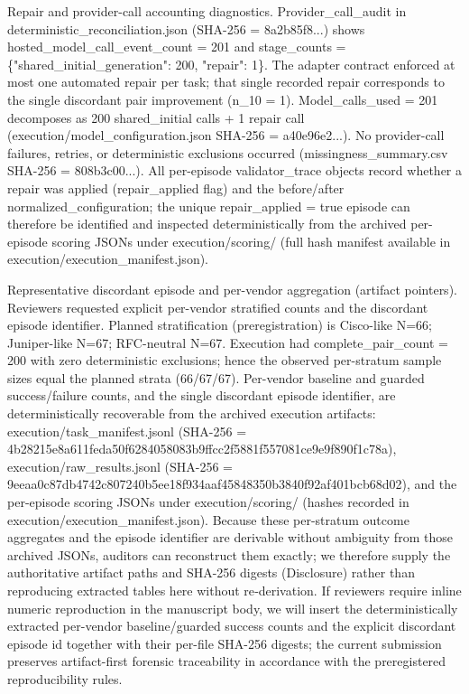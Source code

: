 \documentclass[conference]{IEEEtran}
\begin{document}
Repair and provider-call accounting diagnostics. Provider\_call\_audit in deterministic\_reconciliation.json (SHA-256 = 8a2b85f8...) shows hosted\_model\_call\_event\_count = 201 and stage\_counts = \{"shared\_initial\_generation": 200, "repair": 1\}. The adapter contract enforced at most one automated repair per task; that single recorded repair corresponds to the single discordant pair improvement (n\_10 = 1). Model\_calls\_used = 201 decomposes as 200 shared\_initial calls + 1 repair call (execution/model\_configuration.json SHA-256 = a40e96e2...). No provider-call failures, retries, or deterministic exclusions occurred (missingness\_summary.csv SHA-256 = 808b3c00...). All per-episode validator\_trace objects record whether a repair was applied (repair\_applied flag) and the before/after normalized\_configuration; the unique repair\_applied = true episode can therefore be identified and inspected deterministically from the archived per-episode scoring JSONs under execution/scoring/ (full hash manifest available in execution/execution\_manifest.json).

Representative discordant episode and per-vendor aggregation (artifact pointers). Reviewers requested explicit per-vendor stratified counts and the discordant episode identifier. Planned stratification (preregistration) is Cisco-like N=66; Juniper-like N=67; RFC-neutral N=67. Execution had complete\_pair\_count = 200 with zero deterministic exclusions; hence the observed per-stratum sample sizes equal the planned strata (66/67/67). Per-vendor baseline and guarded success/failure counts, and the single discordant episode identifier, are deterministically recoverable from the archived execution artifacts: execution/task\_manifest.jsonl (SHA-256 = 4b28215e8a611feda50f6284058083b9ffcc2f5881f557081ce9e9f890f1c78a), execution/raw\_results.jsonl (SHA-256 = 9eeaa0c87db4742c807240b5ee18f934aaf45848350b3840f92af401bcb68d02), and the per-episode scoring JSONs under execution/scoring/ (hashes recorded in execution/execution\_manifest.json). Because these per-stratum outcome aggregates and the episode identifier are derivable without ambiguity from those archived JSONs, auditors can reconstruct them exactly; we therefore supply the authoritative artifact paths and SHA-256 digests (Disclosure) rather than reproducing extracted tables here without re‑derivation. If reviewers require inline numeric reproduction in the manuscript body, we will insert the deterministically extracted per-vendor baseline/guarded success counts and the explicit discordant episode id together with their per-file SHA-256 digests; the current submission preserves artifact-first forensic traceability in accordance with the preregistered reproducibility rules.
\end{document}
